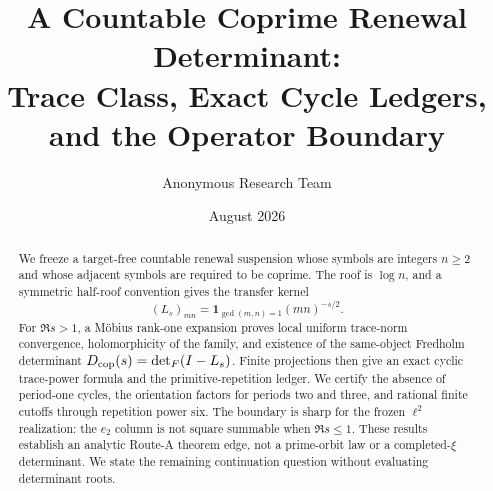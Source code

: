 \documentclass[11pt]{article}
\title{A Countable Coprime Renewal Determinant:\\
Trace Class, Exact Cycle Ledgers, and the Operator Boundary}
\author{Anonymous Research Team}
\date{August 2026}
\theoremstyle{definition}
\begin{document}
\maketitle

\begin{abstract}
We freeze a target-free countable renewal suspension whose symbols are
integers \(n\geq2\) and whose adjacent symbols are required to be coprime.
The roof is \(\log n\), and a symmetric half-roof convention gives the
transfer kernel
\[
 (L_s)_{mn}=\mathbf 1_{\gcd(m,n)=1}(mn)^{-s/2}.
\]
For \(\Re s>1\), a Möbius rank-one expansion proves local uniform
trace-norm convergence, holomorphicity of the family, and existence of the
same-object Fredholm determinant \(D_{\rm cop}(s)=\det_F(I-L_s)\).
Finite projections then give an exact cyclic trace-power formula and the
primitive-repetition ledger.  We certify the absence of period-one cycles,
the orientation factors for periods two and three, and rational finite
cutoffs through repetition power six.  The boundary is sharp for the frozen
\(\ell^2\) realization: the \(e_2\) column is not square summable when
\(\Re s\leq1\).  These results establish an analytic Route-A theorem edge,
not a prime-orbit law or a completed-\(\xi\) determinant.  We state the
remaining continuation question without evaluating determinant roots.
\end{abstract}








\appendix

\end{document}
